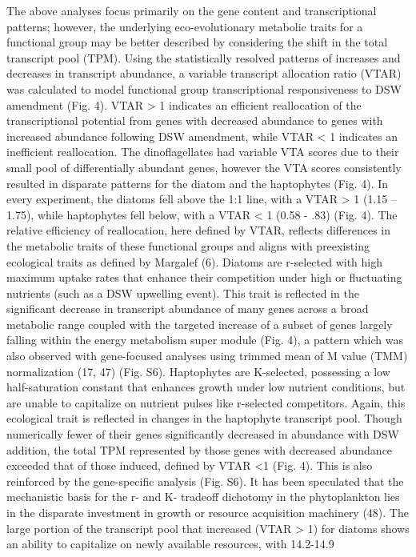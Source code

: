 The above analyses focus primarily on the gene content and transcriptional patterns; however, the underlying eco-evolutionary metabolic traits for a functional group may be better described by considering the shift in the total transcript pool (TPM). Using the statistically resolved patterns of increases and decreases in transcript abundance, a variable transcript allocation ratio (VTAR) was calculated to model functional group transcriptional responsiveness to DSW amendment (Fig. 4). VTAR > 1 indicates an efficient reallocation of the transcriptional potential from genes with decreased abundance to genes with increased abundance following DSW amendment, while VTAR < 1 indicates an inefficient reallocation. The dinoflagellates had variable VTA scores due to their small pool of differentially abundant genes, however the VTA scores consistently resulted in disparate patterns for the diatom and the haptophytes (Fig. 4). In every experiment, the diatoms fell above the 1:1 line, with a VTAR > 1 (1.15 – 1.75), while haptophytes fell below, with a VTAR < 1 (0.58 - .83) (Fig. 4). The relative efficiency of reallocation, here defined by VTAR, reflects differences in the metabolic traits of these functional groups and aligns with preexisting ecological traits as defined by Margalef (6). Diatoms are r-selected with high maximum uptake rates that enhance their competition under high or fluctuating nutrients (such as a DSW upwelling event). This trait is reflected in the significant decrease in transcript abundance of many genes across a broad metabolic range coupled with the targeted increase of a subset of genes largely falling within the energy metabolism super module (Fig. 4), a pattern which was also observed with gene-focused analyses using trimmed mean of M value (TMM) normalization (17, 47) (Fig. S6). Haptophytes are K-selected, possessing a low half-saturation constant that enhances growth under low nutrient conditions, but are unable to capitalize on nutrient pulses like r-selected competitors. Again, this ecological trait is reflected in changes in the haptophyte transcript pool. Though numerically fewer of their genes significantly decreased in abundance with DSW addition, the total TPM represented by those genes with decreased abundance exceeded that of those induced, defined by VTAR <1 (Fig. 4). This is also reinforced by the gene-specific analysis (Fig. S6). It has been speculated that the mechanistic basis for the r- and K- tradeoff dichotomy in the phytoplankton lies in the disparate investment in growth or resource acquisition machinery (48). The large portion of the transcript pool that increased (VTAR > 1) for diatoms shows an ability to capitalize on newly available resources, with 14.2-14.9%

